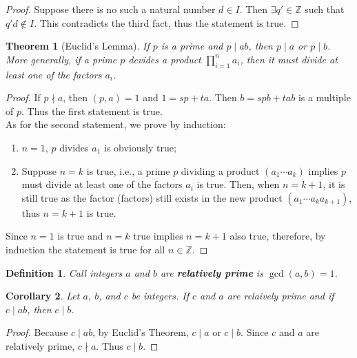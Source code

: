 \documentclass{article}
\newtheorem*{definition}{Definition}
\newtheorem{theorem}{Theorem}[section]
\newtheorem{corollary}[theorem]{Corollary}
\begin{document}
    \begin{proof}
        Suppose there is no such a natural number \(d \in I\). Then \(\exists q' \in \mathbb{Z}\)
        such that \(q'd \notin I\). This contradicts the third fact, thus the statement is true.
    \end{proof}
    \begin{theorem}[Euclid's Lemma]
        If \(p\) is a prime and \(p \mid ab\), then \(p \mid a\) or \(p \mid b\). More 
        generally, if a prime \(p\) devides a product \(\prod_{i=1}^n a_i\), then it must 
        divide at least one of the factors \(a_i\).
    \end{theorem}
    \begin{proof}
        If \(p \nmid a\), then \((p, a)=1\) and \(1=sp+ta\). Then \(b=spb+tab\) is a 
        multiple of \(p\). Thus the first statement is true.\\
        As for the second statement, we prove by induction:
        \begin{enumerate}
            \item \(n=1\), \(p\) divides \(a_1\) is obviously true;
            \item Suppose \(n=k\) is true, i.e., a prime \(p\) dividing a product 
            \((a_1\cdots a_k)\) implies \(p\) must divide at least one of the factors 
            \(a_i\) is true. Then, when \(n=k+1\), it is still true as the factor (factors) 
            still exists in the new product \((a_1\cdots a_k a_{k+1})\), thus \(n=k+1\) is 
            true.
        \end{enumerate}
        Since \(n=1\) is true and \(n=k\) true implies \(n=k+1\) also true, therefore, by 
        induction the statement is true for all \(n \in \mathbb{Z}\).
    \end{proof}
    \begin{definition}
        Call integers \(a\) and \(b\) are \textbf{relatively prime} is \(\gcd(a, b)=1\).
    \end{definition}
    \begin{corollary}
        Let \(a\), \(b\), and \(c\) be integers. If \(c\) and \(a\) are relaively prime 
        and if \(c \mid ab\), then \(c \mid b\).
    \end{corollary}
    \begin{proof}
        Because \(c \mid ab\), by Euclid's Theorem, \(c \mid a\) or \(c \mid b\). 
        Since \(c\) and \(a\) are relatively prime, \(c \nmid a\). Thus \(c \mid b\).
    \end{proof}
\end{document}
